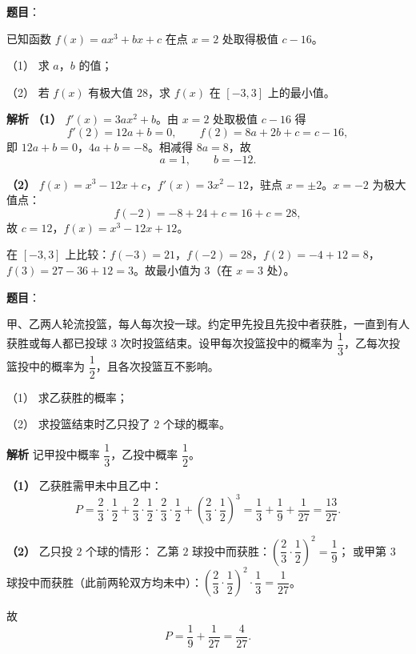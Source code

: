 \begin{answer}

\textbf{题目}：

已知函数 $f(x)=ax^3+bx+c$ 在点 $x=2$ 处取得极值 $c-16$。

（1） 求 $a$，$b$ 的值；

（2） 若 $f(x)$ 有极大值 $28$，求 $f(x)$ 在 $[-3,3]$ 上的最小值。

\textbf{解析}
\textbf{（1）} $f'(x)=3ax^2+b$。由 $x=2$ 处取极值 $c-16$ 得
\nopagebreak[4]
\[f'(2)=12a+b=0,\qquad f(2)=8a+2b+c=c-16,\]
即 $12a+b=0$，$4a+b=-8$。相减得 $8a=8$，故
\nopagebreak[4]
\[a=1,\qquad b=-12.\]

\textbf{（2）} $f(x)=x^3-12x+c$，$f'(x)=3x^2-12$，驻点 $x=\pm2$。$x=-2$ 为极大值点：
\nopagebreak[4]
\[f(-2)=-8+24+c=16+c=28,\]
故 $c=12$，$f(x)=x^3-12x+12$。

在 $[-3,3]$ 上比较：$f(-3)=21$，$f(-2)=28$，$f(2)=-4+12=8$，$f(3)=27-36+12=3$。故最小值为 $3$（在 $x=3$ 处）。



\end{answer}
\begin{answer}

\textbf{题目}：

甲、乙两人轮流投篮，每人每次投一球。约定甲先投且先投中者获胜，一直到有人获胜或每人都已投球 $3$ 次时投篮结束。设甲每次投篮投中的概率为 $\dfrac13$，乙每次投篮投中的概率为 $\dfrac12$，且各次投篮互不影响。

（1） 求乙获胜的概率；

（2） 求投篮结束时乙只投了 $2$ 个球的概率。

\textbf{解析}
记甲投中概率 $\dfrac13$，乙投中概率 $\dfrac12$。

\textbf{（1）} 乙获胜需甲未中且乙中：
\nopagebreak[4]
\[P=\frac23\cdot\frac12+\frac23\cdot\frac12\cdot\frac23\cdot\frac12+\left(\frac23\cdot\frac12\right)^3=\frac13+\frac19+\frac1{27}=\frac{13}{27}.\]

\textbf{（2）} 乙只投 $2$ 个球的情形：
乙第 $2$ 球投中而获胜：$\left(\dfrac23\cdot\dfrac12\right)^2=\dfrac19$；
或甲第 $3$ 球投中而获胜（此前两轮双方均未中）：$\left(\dfrac23\cdot\dfrac12\right)^2\cdot\dfrac13=\dfrac1{27}$。

故
\nopagebreak[4]
\[P=\frac19+\frac1{27}=\frac4{27}.\]



\end{answer}
